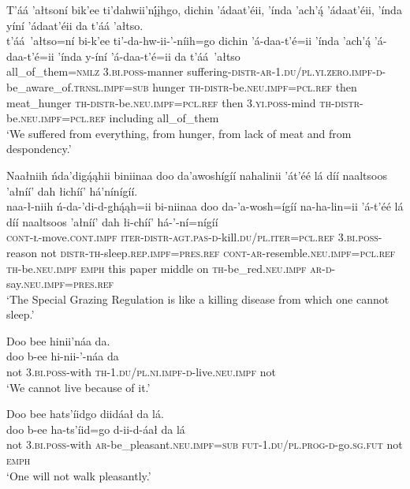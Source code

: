 \ea\label{ex:text8-3-9}
T’áá ’ałtsoní bik’ee ti’dahwii’nį́įhgo, dichin ’ádaat’éii, ’índa ’ach’ą́ ’ádaat’éii, ’índa yíní ’ádaat’éii da t’áá ’ałtso.\\
\gll t’áá~{’ałtso=ní}	bi-k’ee	ti’-da-hw-ii-’-níih=go	dichin	’á-daa-t’é=ii	’índa	’ach’ą́	’á-daa-t’é=ii	’índa	y-íní	’á-daa-t’é=ii	da	t’áá~{’ałtso}\\
     all\_of\_them=\textsc{nmlz}	3.\textsc{bi}.\textsc{poss}-manner	suffering-\textsc{distr}-\textsc{ar}-1.\textsc{du}/\textsc{pl}.\textsc{yi}.\textsc{zero}.\textsc{impf}-\textsc{d}-be\_aware\_of.\textsc{trnsl}.\textsc{impf}=\textsc{sub}	hunger	\textsc{th}-\textsc{distr}-be.\textsc{neu}.\textsc{impf}=\textsc{pcl}.\textsc{ref}	then	meat\_hunger	\textsc{th}-\textsc{distr}-be.\textsc{neu}.\textsc{impf}=\textsc{pcl}.\textsc{ref}	then	3.\textsc{yi}.\textsc{poss}-mind	\textsc{th}-\textsc{distr}-be.\textsc{neu}.\textsc{impf}=\textsc{pcl}.\textsc{ref}	including	all\_of\_them\\
\glt `We suffered from everything, from hunger, from lack of meat and from despondency.'
\z

\ea\label{ex:text8-3-10}
Naałniih ńda’digą́ąhii biniinaa doo da’awoshígíí nahalinii ’át’éé lá díí naaltsoos ’ałníí’ dah łichíí’ há’nínígíí.\\
\gll naa-ł-niih	ń-da-’di-d-ghą́ąh=ii	bi-niinaa	doo	da-’a-wosh=ígíí	na-ha-lin=ii	’á-t’éé	lá	díí	naaltsoos	’ałníí’	dah	łi-chíí’	há-’-ní=nígíí\\
     \textsc{cont}-\textsc{ł}-move.\textsc{cont}.\textsc{impf}	\textsc{iter}-\textsc{distr}-\textsc{agt}.\textsc{pas}-\textsc{d}-kill.\textsc{du}/\textsc{pl}.\textsc{iter}=\textsc{pcl}.\textsc{ref}	3.\textsc{bi}.\textsc{poss}-reason	not	\textsc{distr}-\textsc{th}-sleep.\textsc{rep}.\textsc{impf}=\textsc{pres}.\textsc{ref}	\textsc{cont}-\textsc{ar}-resemble.\textsc{neu}.\textsc{impf}=\textsc{pcl}.\textsc{ref}	\textsc{th}-be.\textsc{neu}.\textsc{impf}	\textsc{emph}	this	paper	middle	on	\textsc{th}-be\_red.\textsc{neu}.\textsc{impf}	\textsc{ar}-\textsc{d}-say.\textsc{neu}.\textsc{impf}=\textsc{pres}.\textsc{ref}\\
\glt `The Special Grazing Regulation is like a killing disease from which one cannot sleep.'
\z

\ea\label{ex:text8-3-11}
Doo bee hinii’náa da.\\
\gll doo	b-ee	hi-nii-’-náa	da\\
     not	3.\textsc{bi}.\textsc{poss}-with	\textsc{th}-1.\textsc{du}/\textsc{pl}.\textsc{ni}.\textsc{impf}-\textsc{d}-live.\textsc{neu}.\textsc{impf}	not\\
\glt `We cannot live because of it.'
\z

\ea\label{ex:text8-3-12}
Doo bee hats’íidgo diidáał da lá.\\
\gll doo	b-ee	ha-ts’íid=go	d-ii-d-áał	da	lá\\
     not	3.\textsc{bi}.\textsc{poss}-with	\textsc{ar}-be\_pleasant.\textsc{neu}.\textsc{impf}=\textsc{sub}	\textsc{fut}-1.\textsc{du}/\textsc{pl}.\textsc{prog}-\textsc{d}-go.\textsc{sg}.\textsc{fut}	not	\textsc{emph}\\
\glt `One will not walk pleasantly.'
\z
